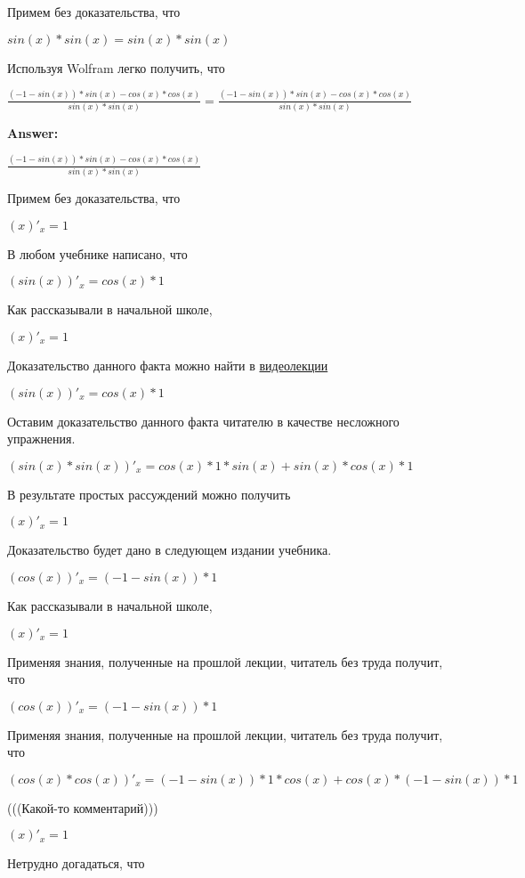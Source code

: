 \documentclass[12pt,a4paper,fleqn]{article}
\theoremstyle{definition}
\begin{document}
Примем без доказательства, что 

$sin( x ) * sin( x ) = sin( x ) * sin( x )$

Используя Wolfram легко получить, что 

$\frac{( -1  - sin( x )) * sin( x ) - cos( x ) * cos( x )}{sin( x ) * sin( x )}
 = \frac{( -1  - sin( x )) * sin( x ) - cos( x ) * cos( x )}{sin( x ) * sin( x )}
$


\textbf{Answer:}

$\frac{( -1  - sin( x )) * sin( x ) - cos( x ) * cos( x )}{sin( x ) * sin( x )}
$

Примем без доказательства, что 

$( x )'_{x} =  1 $

В любом учебнике написано, что 

$(sin( x ))'_{x} = cos( x ) *  1 $

Как рассказывали в начальной школе, 

$( x )'_{x} =  1 $

Доказательство данного факта можно найти в \href{https://www.youtube.com/watch?v=dQw4w9WgXcQ}{видеолекции} 

$(sin( x ))'_{x} = cos( x ) *  1 $

Оставим доказательство данного факта читателю в качестве несложного упражнения. 

$(sin( x ) * sin( x ))'_{x} = cos( x ) *  1  * sin( x ) + sin( x ) * cos( x ) *  1 $

В результате простых рассуждений можно получить 

$( x )'_{x} =  1 $

Доказательство будет дано в следующем издании учебника. 

$(cos( x ))'_{x} = ( -1  - sin( x )) *  1 $

Как рассказывали в начальной школе, 

$( x )'_{x} =  1 $

Применяя знания, полученные на прошлой лекции, читатель без труда получит, что 

$(cos( x ))'_{x} = ( -1  - sin( x )) *  1 $

Применяя знания, полученные на прошлой лекции, читатель без труда получит, что 

$(cos( x ) * cos( x ))'_{x} = ( -1  - sin( x )) *  1  * cos( x ) + cos( x ) * ( -1  - sin( x )) *  1 $

(((Какой-то комментарий))) 

$( x )'_{x} =  1 $

Нетрудно догадаться, что 
\end{document}
